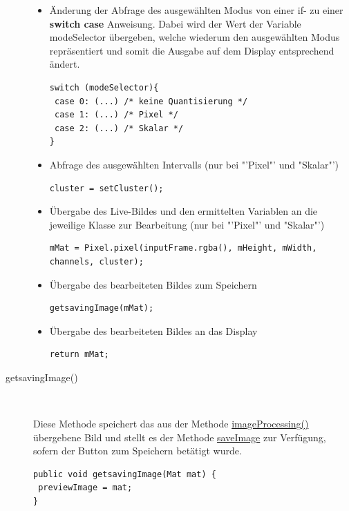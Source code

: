 \begin{description}
\begin{itemize}
\item Änderung der Abfrage des ausgewählten Modus von einer if- zu einer \textbf{switch case} Anweisung. Dabei wird der Wert der Variable \textcolor{lila}{modeSelector} übergeben, welche wiederum den ausgewählten Modus repräsentiert und somit die Ausgabe auf dem Display entsprechend ändert.
\begin{lstlisting}
switch (modeSelector){
 case 0: (...) /* keine Quantisierung */
 case 1: (...) /* Pixel */
 case 2: (...) /* Skalar */
}
\end{lstlisting}
\item Abfrage des ausgewählten Intervalls (nur bei "'Pixel"' und "Skalar"')
\begin{lstlisting}
cluster = setCluster();
\end{lstlisting}
\item Übergabe des Live-Bildes und den ermittelten Variablen an die jeweilige Klasse zur Bearbeitung (nur bei "'Pixel"' und "Skalar"')
\begin{lstlisting}
mMat = Pixel.pixel(inputFrame.rgba(), mHeight, mWidth, channels, cluster);
\end{lstlisting}
\item Übergabe des bearbeiteten Bildes zum Speichern
\begin{lstlisting}
getsavingImage(mMat);
\end{lstlisting}
\item Übergabe des bearbeiteten Bildes an das Display
\begin{lstlisting}
return mMat;
\end{lstlisting}
\end{itemize}

\newpage

\item[getsavingImage()]~\par
\label{getsavingImage}
Diese Methode speichert das aus der Methode \hyperref[imageProcessing]{imageProcessing()} übergebene Bild und stellt es der Methode \hyperref[saveImage]{saveImage} zur Verfügung, sofern der Button zum Speichern betätigt wurde.
\begin{lstlisting}
public void getsavingImage(Mat mat) {
 previewImage = mat;
}
\end{lstlisting}


\end{description}
